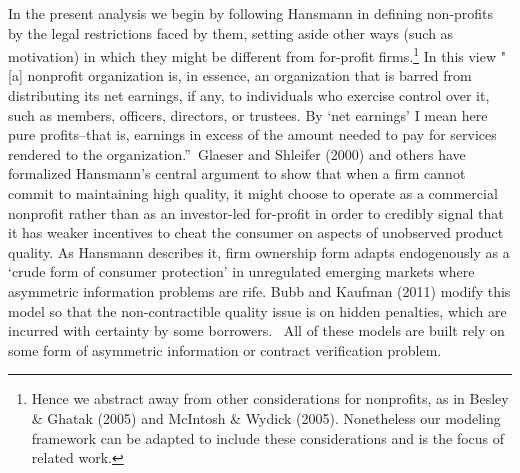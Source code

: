 \documentclass[11pt]{article}%
\begin{document}
In the present analysis we begin by following Hansmann in defining non-profits
by the legal restrictions faced by them, setting aside other ways (such as
motivation) in which they might be different from for-profit
firms.\footnote{Hence we abstract away from other considerations for
nonprofits, as in Besley \& Ghatak (2005) and McIntosh \& Wydick (2005).
Nonetheless our modeling framework can be adapted to include these
considerations and is the focus of related work.} In this view "[a] nonprofit
organization is, in essence, an organization that is barred from distributing
its net earnings, if any, to individuals who exercise control over it, such as
members, officers, directors, or trustees. By `net earnings' I mean here pure
profits--that is, earnings in excess of the amount needed to pay for services
rendered to the organization.\textquotedblright\ Glaeser and Shleifer (2000)
and others have formalized Hansmann's central argument to show that when a
firm cannot commit to maintaining high quality, it might choose to operate as
a commercial nonprofit rather than as an investor-led for-profit in order to
credibly signal that it has weaker incentives to cheat the consumer on aspects
of unobserved product quality. As Hansmann describes it, firm ownership form
adapts endogenously as a `crude form of consumer protection' in unregulated
emerging markets where asymmetric information problems are rife. Bubb and
Kaufman (2011) modify this model so that the non-contractible quality issue is
on hidden penalties, which are incurred with certainty by some borrowers.
\ All of these models are built rely on some form of asymmetric information or
contract verification problem.
\end{document}
